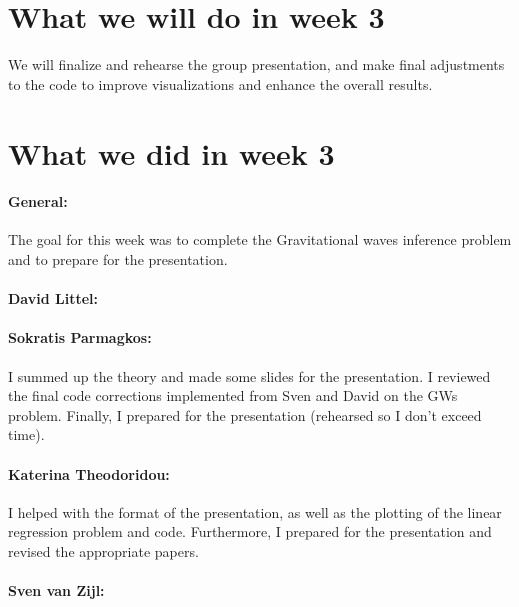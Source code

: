 \documentclass{article}
\begin{document}
\section*{What we will do in week 3}
We will finalize and rehearse the group presentation, and make final adjustments to the code to improve visualizations and enhance the overall results.


\section*{What we did in week 3}
\paragraph{General:}
The goal for this week was to complete the Gravitational waves inference problem and to prepare for the presentation.

\paragraph{David Littel:}


\paragraph{Sokratis Parmagkos:}
I summed up the theory and made some slides for the presentation. I reviewed the final code corrections implemented from Sven and David on the GWs problem. Finally, I prepared for the presentation (rehearsed so I don't exceed time).

\paragraph{Katerina Theodoridou:}
I helped with the format of the presentation, as well as the plotting of the linear regression problem and code. Furthermore, I prepared for the presentation and revised the appropriate papers. 

\paragraph{Sven van Zijl:}
\end{document}
